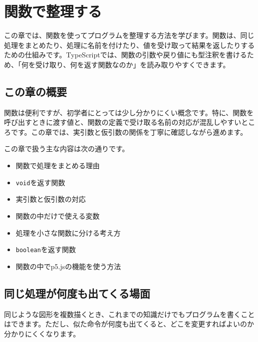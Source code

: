 \chapter{関数で整理する}
\label{chap:functions}

この章では、関数を使ってプログラムを整理する方法を学びます。関数は、同じ処理をまとめたり、処理に名前を付けたり、値を受け取って結果を返したりするための仕組みです。TypeScriptでは、関数の引数や戻り値にも型注釈を書けるため、「何を受け取り、何を返す関数なのか」を読み取りやすくできます。

\section{この章の概要}

関数は便利ですが、初学者にとっては少し分かりにくい概念です。特に、関数を呼び出すときに渡す値と、関数の定義で受け取る名前の対応が混乱しやすいところです。この章では、実引数と仮引数の関係を丁寧に確認しながら進めます。

この章で扱う主な内容は次の通りです。

\begin{itemize}
    \item 関数で処理をまとめる理由
    \item \texttt{void}を返す関数
    \item 実引数と仮引数の対応
    \item 関数の中だけで使える変数
    \item 処理を小さな関数に分ける考え方
    \item \texttt{boolean}を返す関数
    \item 関数の中でp5.jsの機能を使う方法
\end{itemize}

\section{同じ処理が何度も出てくる場面}

同じような図形を複数描くとき、これまでの知識だけでもプログラムを書くことはできます。ただし、似た命令が何度も出てくると、どこを変更すればよいのか分かりにくくなります。

\begin{listing}[htbp]
\inputminted{ts}{typescript-p5/listings/chapter08/repeated-cars-without-function.ts}
\caption{関数を使わずに2台の車を描く（\texttt{chapter08/repeated-cars-without-function.ts}）}
\label{lst:chapter08-repeated-cars-without-function}
\end{listing}

